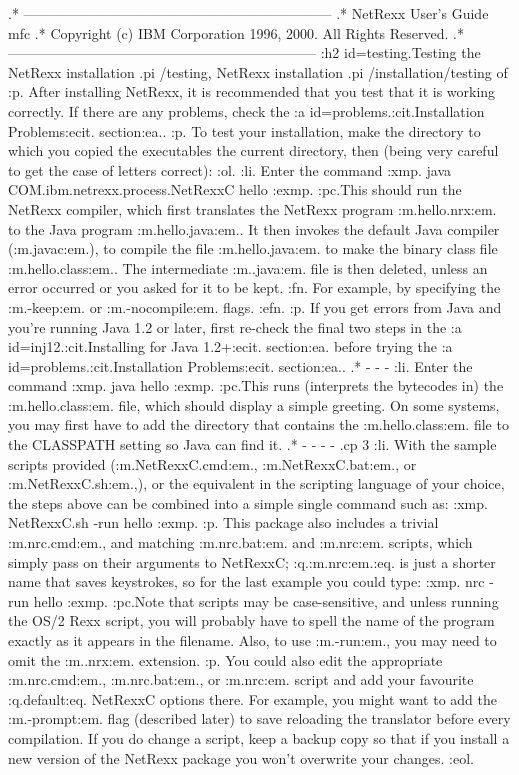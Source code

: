 .* ------------------------------------------------------------------
.* NetRexx User's Guide                                              mfc
.* Copyright (c) IBM Corporation 1996, 2000.  All Rights Reserved.
.* ------------------------------------------------------------------
:h2 id=testing.Testing the NetRexx installation
.pi /testing, NetRexx installation
.pi /installation/testing of
:p.
After installing NetRexx, it is recommended that you test that it is
working correctly.  If there are any problems, check the
:a id=problems.:cit.Installation Problems:ecit. section:ea..
:p.
To test your installation, make the directory to which you copied the
executables the current directory, then (being very careful to get the
case of letters correct):
:ol.
:li.
Enter the command
:xmp.
java COM.ibm.netrexx.process.NetRexxC hello
:exmp.
:pc.This should run the NetRexx compiler, which first translates the
NetRexx program :m.hello.nrx:em. to the Java program :m.hello.java:em..
It then invokes the default Java compiler (:m.javac:em.), to compile the
file :m.hello.java:em. to make the binary class file :m.hello.class:em..
The intermediate :m..java:em. file is then deleted, unless an error
occurred or you asked for it to be kept.
:fn.
For example, by specifying the :m.-keep:em. or :m.-nocompile:em. flags.
:efn.
:p.
If you get errors from Java and you're running Java 1.2 or later,
first re-check the final two steps in the :a id=inj12.:cit.Installing
for Java 1.2+:ecit. section:ea. before trying the
:a id=problems.:cit.Installation Problems:ecit. section:ea..
.* - - -
:li.
Enter the command
:xmp.
java hello
:exmp.
:pc.This runs (interprets the bytecodes in) the :m.hello.class:em. file,
which should display a simple greeting.  On some systems, you may
first have to add the directory that contains the :m.hello.class:em.
file to the CLASSPATH setting so Java can find it.
.* - - - -
.cp 3
:li.
With the sample scripts provided (:m.NetRexxC.cmd:em., :m.NetRexxC.bat:em.,
or :m.NetRexxC.sh:em.,), or the equivalent in the scripting language of
your choice, the steps above can be combined into a simple single
command such as:
:xmp.
NetRexxC.sh -run hello
:exmp.
:p.
This package also includes a trivial :m.nrc.cmd:em., and
matching :m.nrc.bat:em. and :m.nrc:em. scripts, which simply pass on
their arguments to NetRexxC; :q.:m.nrc:em.:eq. is just a shorter name
that saves keystrokes, so for the last example you could type:
:xmp.
nrc -run hello
:exmp.
:pc.Note that scripts may be case-sensitive, and unless running the OS/2
Rexx script, you will probably have to spell the name of the program
exactly as it appears in the filename.  Also, to use :m.-run:em., you
may need to omit the :m..nrx:em. extension.
:p.
You could also edit the appropriate :m.nrc.cmd:em., :m.nrc.bat:em.,
or :m.nrc:em. script and add your favourite :q.default:eq. NetRexxC
options there.
For example, you might want to add the :m.-prompt:em. flag (described
later) to save reloading the translator before every compilation.
If you do change a script, keep a backup copy so that if you install
a new version of the NetRexx package you won't overwrite your changes.
:eol.
